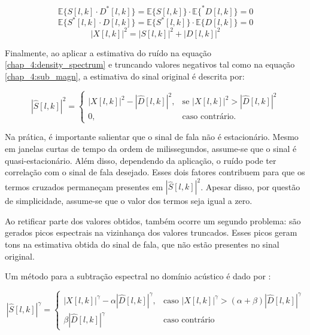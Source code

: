 \begin{equation}
    \mathbb{E}\{S[l, k]\cdot D^*[l,k]\} = \mathbb{E}\{S[l, k]\} \cdot \mathbb{E}\{^*D[l, k]\} = 0
\end{equation}
\begin{equation}
    \mathbb{E}\{S^*[l, k]\cdot D[l,k]\} = \mathbb{E}\{S^*[l, k]\} \cdot \mathbb{E}\{D[l, k]\} = 0
\end{equation}
\begin{equation} \label{chap_4:density_spectrum}
    |X[l, k]|^2 = |S[l, k]|^2 + |D[l, k]|^2
\end{equation}

Finalmente, ao aplicar a estimativa do ruído na equação
\eqref{chap_4:density_spectrum} e truncando valores negativos tal como na
equação \eqref{chap_4:sub_magn}, a estimativa do sinal original é descrita por:

\begin{equation} \label{chap_4:sub_pow}
    |\hat{S}[l, k]|^2 =
    \begin{cases}
     |X[l, k]|^2 - |\hat{D}[l, k]|^2, & \text{se }|X[l, k]|^2 > |\hat{D}[l, k]|^2 \\
     0, & \text{caso contrário.}
    \end{cases}
\end{equation}

Na prática, é importante salientar que o sinal de fala não é estacionário. Mesmo
em janelas curtas de tempo da ordem de milissegundos, assume-se que o sinal é
quasi-estacionário. Além disso, dependendo da aplicação, o ruído pode ter
correlação com o sinal de fala desejado. Esses dois fatores contribuem para que
os termos cruzados permaneçam presentes em $|\hat{S}[l, k]|^2$. Apesar disso,
por questão de simplicidade, assume-se que o valor dos termos seja igual a zero.

Ao retificar parte dos valores obtidos, também ocorre um segundo problema: são
gerados picos espectrais na vizinhança dos valores truncados. Esses picos geram
tons na estimativa obtida do sinal de fala, que não estão presentes no sinal
original.

Um método para a subtração espectral no domínio acústico é dado por
\cite{zhang2013} \label{berouti1979enhancement}: 

\begin{equation} \label{chap_04:berouti}
    |\hat{S}[l, k]|^\gamma =
    \begin{cases}
        |X[l, k]|^\gamma - \alpha|\hat{D}[l, k]|^\gamma, &  \text{caso } |X[l, k]|^\gamma > (\alpha + \beta)|\hat{D}[l, k]|^\gamma \\
        \beta|\hat{D}[l, k]|^\gamma&  \text{caso contrário}
    \end{cases}
\end{equation}

